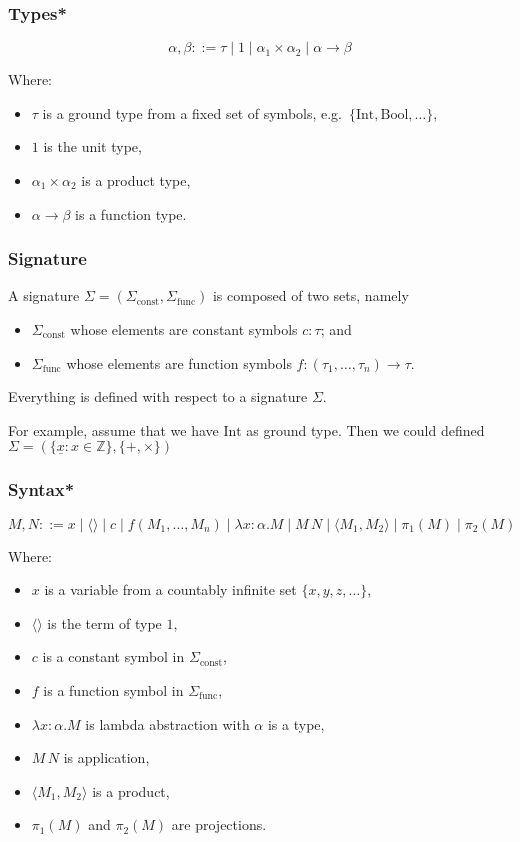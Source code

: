 \documentclass[aspectratio=169]{beamer}
\begin{document}
\begin{frame}
\frametitle{Types*}
\[
\alpha, \beta ::= \tau \mid 1 \mid \alpha_1 \times \alpha_2 \mid \alpha \rightarrow \beta
\]

Where:
\begin{itemize}
    \item $\tau$ is a ground type from a fixed set of symbols, e.g.\ $\{\text{Int}, \text{Bool}, \ldots\},$
    \item $1$ is the unit type,
    \item $\alpha_1 \times \alpha_2$ is a product type,
    \item $\alpha \rightarrow \beta$ is a function type.
\end{itemize}
\end{frame}

\begin{frame}
\frametitle{Signature}
A signature $\Sigma = (\Sigma_{\text{const}}, \Sigma_{\text{func}})$ is composed of two sets, namely
\begin{itemize}
    \item $\Sigma_{\text{const}}$ whose elements are constant symbols $c : \tau$; and
    \item $\Sigma_{\text{func}}$ whose elements are function symbols $f : (\tau_1, \ldots, \tau_n) \to \tau$.
\end{itemize}
Everything is defined with respect to a signature $\Sigma$.

\medskip

For example, assume that we have $\text{Int}$ as ground type.
Then we could defined $\Sigma = \left(\{\underline{x} : x \in \mathbb{Z}\}, \{+, \times\}\right)$ 

\end{frame}

\begin{frame}
\frametitle{Syntax*}

\[
M, N ::= x \mid \langle \rangle \mid c \mid f(M_1, \ldots, M_n) \mid \lambda x: \alpha. M \mid M \, N \mid \langle M_1, M_2 \rangle \mid \pi_1(M) \mid \pi_2(M)
\]

Where:
\begin{itemize}
    \item $x$ is a variable from a countably infinite set $\{x, y, z, \ldots \}$,
    \item $\langle \rangle$ is the term of type $1$,
    \item $c$ is a constant symbol in $\Sigma_{\text{const}}$,
    \item $f$ is a function symbol in $\Sigma_{\text{func}}$,
    \item $\lambda x: \alpha. M$ is lambda abstraction with $\alpha$ is a type,
    \item $M\, N$ is application,
    \item $\langle M_1, M_2 \rangle$ is a product,
    \item $\pi_1(M)$ and $\pi_2(M)$ are projections.
\end{itemize}
\end{frame}
\end{document}
